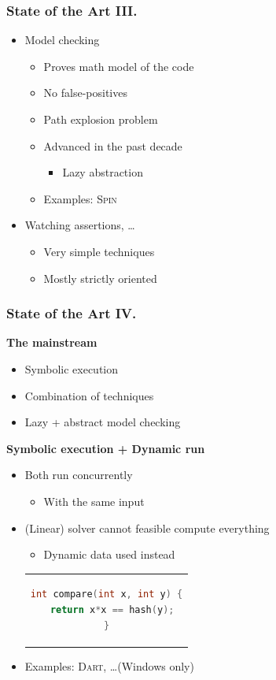 \documentclass[handout,xcolor=dvipsnames]{beamer}
\newcommand{\heading}[1]{\textbf{\textcolor{BurntOrange}{#1}}}
\begin{document}
\begin{frame}
  \frametitle{State of the Art III.}
  \begin{itemize}
  \item[(3)] Model checking
  \begin{itemize}
  \item Proves math model of the code
  \item No false-positives
  \item Path explosion problem
  \item Advanced in the past decade
  \begin{itemize}
  \item Lazy abstraction
  \end{itemize}
  \item Examples: \textsc{Spin}
  \end{itemize}

  \pause

  \item[(4-)] Watching assertions, \ldots
  \begin{itemize}
  \item Very simple techniques
  \item Mostly strictly oriented
  \end{itemize}
  \end{itemize}

\end{frame}

\begin{frame}[fragile]
  \frametitle{State of the Art IV.}

  \heading{The mainstream}
  \begin{itemize}
  \item Symbolic execution
  \item Combination of techniques
  \item Lazy + abstract model checking
  \end{itemize}
  \pause
  \medskip

  \heading{Symbolic execution + Dynamic run}
  \begin{itemize}
  \item Both run concurrently
  \begin{itemize}
  \item With the same input
  \end{itemize}
  \item (Linear) solver cannot feasible compute everything
  \begin{itemize}
  \item Dynamic data used instead
  \end{itemize}
  \begin{center}
  \begin{tabular}{c}
  \begin{lstlisting}[language=C]
int compare(int x, int y) {
  return x*x == hash(y);
}
  \end{lstlisting}
  \end{tabular}
  \end{center}
  \item Examples: \textsc{Dart}, \ldots (Windows only)
  \end{itemize}

\end{frame}
\end{document}

